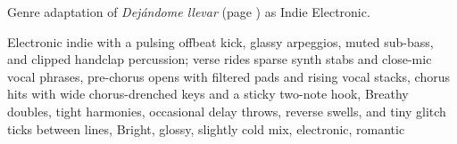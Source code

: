 
\begin{notes}
Genre adaptation of \emph{Dejándome llevar} (page \pageref{sec:dejandome-llevar}) as Indie Electronic.
\end{notes}
\begin{style}
Electronic indie with a pulsing offbeat kick, glassy arpeggios, muted sub-bass, and clipped handclap percussion; verse rides sparse synth stabs and close-mic vocal phrases, pre-chorus opens with filtered pads and rising vocal stacks, chorus hits with wide chorus-drenched keys and a sticky two-note hook, Breathy doubles, tight harmonies, occasional delay throws, reverse swells, and tiny glitch ticks between lines, Bright, glossy, slightly cold mix, electronic, romantic
\end{style}
